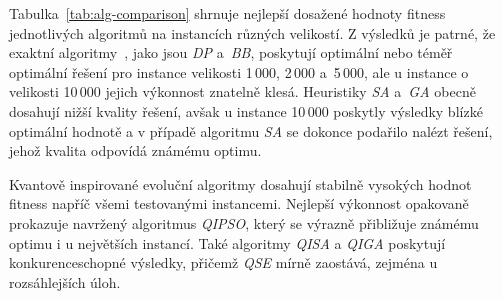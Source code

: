 Tabulka~\ref{tab:alg-comparison} shrnuje nejlepší dosažené hodnoty fitness jednotlivých algoritmů na instancích různých velikostí.
Z výsledků je patrné, že exaktní algoritmy~\cite{compare}, jako jsou \emph{DP} a~\emph{BB}, poskytují optimální nebo téměř optimální řešení pro instance velikosti 1\,000, 2\,000 a~5\,000, ale u instance o velikosti 10\,000 jejich výkonnost znatelně klesá. 
Heuristiky \emph{SA} a~\emph{GA} obecně dosahují nižší kvality řešení, avšak u instance 10\,000 poskytly výsledky blízké optimální hodnotě a v případě algoritmu \emph{SA} se dokonce podařilo nalézt řešení, jehož kvalita odpovídá známému optimu.

Kvantově inspirované evoluční algoritmy dosahují stabilně vysokých hodnot fitness napříč všemi testovanými instancemi. 
Nejlepší výkonnost opakovaně prokazuje navržený algoritmus \emph{QIPSO}, který se výrazně přibližuje známému optimu i u největších instancí.
Také algoritmy \emph{QISA} a \emph{QIGA} poskytují konkurenceschopné výsledky, přičemž \emph{QSE} mírně zaostává, zejména u rozsáhlejších úloh.

